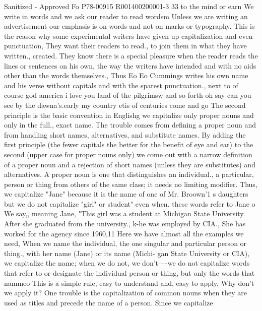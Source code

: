 \documentclass[
    oneside,
    11pt,
    draft
]{memoir}
\begin{document}
Sanitized - Approved Fo P78-00915 R001400200001-3 33 to the mind or earn We write in words and we ask our reader to read wordsm Unless we are writing an advertisement our emphasis is on words and not on marks or typography. This is the reason why some experimental writers have given up capitalization and even punctuation, They want their readers to read., to join them in what they have written., created. They know there is a special pleasure when the reader reads the lines or sentences on his own, the way the writers have intended and with no aids other than the words themselves., Thus Eo Eo Cummings writes his own name and his verse without capitals and with the sparest punctuation., next to of course god america i love you land of the pilgrimsw and so forth oh say can you see by the dawna's.early my country etis of centuries come and go The second principle is the basic convention in Englishg we capitalize only proper nouns and only in the full., exact name. The trouble comes from defining a proper noun and from handling short names, alternatives, and substitute names. By adding the first principle (the fewer capitals the better for the benefit of eye and ear) to the second (upper case for proper nouns only) we come out with a narrow definition of a proper noun and a rejection of short names (unless they are substitutes) and alternatives. A proper noun is one that distinguishes an individual., a particular, person or thing from others of the same class; it needs no limiting modifier. Thus, we capitalize "Jane" because it is the name of one of Mr. Broown'1 s daughters but we do not capitalize "girl" or student" even when. these words refer to Jane o We say,, meaning Jane, "This girl was a student at Michigan State University. After she graduated from the university., k-he was employed by CIA., She has worked for the agency since 1960,11 Here we have almost all the examples we need, When we name the individual, the one singular and particular person or thing., with her name (Jane) or its name (Michi- gan State University or CIA), we capitalize the name; when we do not, we don't----we do not capitalize words that refer to or designate the individual person or thing, but only the words that nammeo This is a simple rule, easy to understand and, easy to apply, Why don't we apply it? One trouble is the capitalization of common nouns when they are used as titles and precede the name of a person. Since we capitalize
\end{document}
